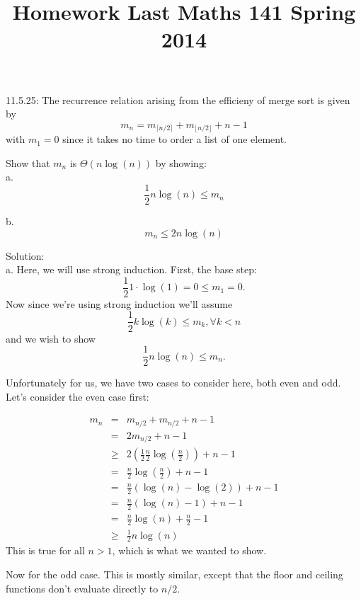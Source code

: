 \documentclass[16 pt]{amsart}
\theoremstyle{definition}
\theoremstyle{remark}
\numberwithin{equation}{subsection}
\newcommand{\half}{\frac{1}{2}}
\begin{document}
\title{Homework Last Maths 141 Spring 2014}
\maketitle 

11.5.25: The recurrence relation arising from the efficieny of merge sort is given by
\[
m_n = m_{\lceil n/2 \rceil} + m_{\lfloor n/2 \rfloor} + n-1
\]
with $m_1 = 0$ since it takes no time to order a list of one element.  

Show that $m_n$ is $\Theta(n\log (n))$ by showing:\\

a. 
\[
\frac{1}{2}n\log(n) \leq m_n
\]

b.
\[
m_n \leq 2n\log(n)
\]


Solution:\\
a. Here, we will use strong induction.  First, the base step:
\[
\half 1\cdot \log(1) = 0 \leq m_1 =0.
\]
Now since we're using strong induction we'll assume
\[
\half k\log(k) \leq m_k, \forall k<n
\]
and we wish to show
\[
\half n\log(n) \leq m_n.
\]


Unfortunately for us, we have two cases to consider here, both even and odd.  Let's consider the even case first:

\begin{eqnarray*}
m_n & = & m_{n/2} + m_{n/2} + n-1\\
    & = & 2 m_{n/2} + n-1\\
    & \geq & 2(\half \frac{n}{2}\log\left(\frac{n}{2}\right)) + n-1\\
    & = & \frac{n}{2} \log\left(\frac{n}{2}\right) + n-1\\
    & = & \frac{n}{2} (\log(n)-\log(2))+n-1\\
    & = & \frac{n}{2}(\log(n)-1)+n-1\\
    & = & \frac{n}{2}\log(n) + \frac{n}{2} - 1 \\
    & \geq & \half n \log(n)
\end{eqnarray*}
This is true for all $n>1$, which is what we wanted to show.

Now for the odd case. This is mostly similar, except that the floor and ceiling functions don't evaluate directly to $n/2$.  
\end{document}
